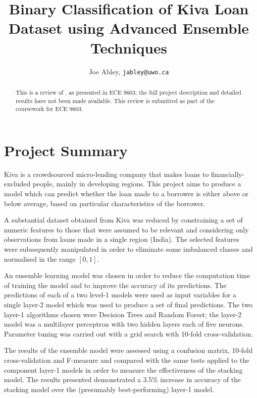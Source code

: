 \documentclass[fontsize=9pt,letterpaper,twocolumn]{scrartcl}
\begin{document}
\titlehead{{\Large Western University \hfill ECE 9603\\}
  Electrical and Computer Engineering \hfill Fall 2018}
\subject{Project Review}
\title{Binary Classification of Kiva Loan Dataset using Advanced Ensemble Techniques}
\author{Joe Abley, \texttt{jabley@uwo.ca}}

\maketitle

\begin{abstract}
This is a review of \cite{Pratapa2018}, as presented in ECE 9603; the full project description and detailed results have not been made available. This review is submitted as part of the coursework for ECE 9603.
\end{abstract}

\section{Project Summary}

Kiva is a crowdsourced micro-lending company that makes loans to financially-excluded people, mainly in developing regions\cite{Kiva}. This project aims to produce a model which can predict whether the loan made to a borrower is either above or below average, based on particular characteristics of the borrower.

A substantial dataset obtained from Kiva was reduced by constraining a set of numeric features to those that were assumed to be relevant and considering only observations from loans made in a single region (India). The selected features were subsequently manipulated in order to eliminate some imbalanced classes and normalised in the range $[0, 1]$.

An ensemble learning model was chosen in order to reduce the computation time of training the model and to improve the accuracy of its predictions. The predictions of each of a two level-1 models were used as input variables for a single layer-2 model which was used to produce a set of final predictions. The two layer-1 algorithms chosen were Decision Trees and Random Forest; the layer-2 model was a multilayer perceptron with two hidden layers each of five neurons. Parameter tuning was carried out with a grid search with 10-fold cross-validation.

The results of the ensemble model were assessed using a confusion matrix, 10-fold cross-validation and F-measure and compared with the same tests applied to the component layer-1 models in order to measure the effectiveness of the stacking model. The results presented demonstrated a 3.5\% increase in accuracy of the stacking model over the (presumably best-performing) layer-1 model.
\end{document}

